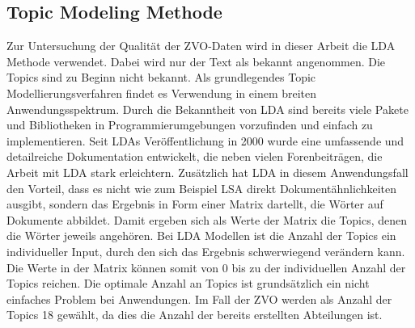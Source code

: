 \documentclass[german,version-2020-11]{uzl-thesis}
\begin{document}
\begin{itemize}
\section{Topic Modeling Methode}
Zur Untersuchung der Qualität der ZVO-Daten wird in dieser Arbeit die LDA Methode verwendet. Dabei wird nur der Text als bekannt angenommen. Die Topics sind zu Beginn nicht bekannt. Als grundlegendes Topic Modellierungsverfahren findet es Verwendung in einem breiten Anwendungsspektrum. Durch die Bekanntheit von LDA sind bereits viele Pakete und Bibliotheken in Programmierumgebungen vorzufinden und einfach zu implementieren. Seit LDAs Veröffentlichung in 2000 wurde eine umfassende und detailreiche Dokumentation entwickelt, die neben vielen Forenbeiträgen, die Arbeit mit LDA stark erleichtern. Zusätzlich hat LDA in diesem Anwendungsfall den Vorteil, dass es nicht wie zum Beispiel LSA direkt Dokumentähnlichkeiten ausgibt, sondern das Ergebnis in Form einer Matrix dartellt, die Wörter auf Dokumente abbildet. Damit ergeben sich als Werte der Matrix die Topics, denen die Wörter jeweils angehören. Bei LDA Modellen ist die Anzahl der Topics ein individueller Input, durch den sich das Ergebnis schwerwiegend verändern kann. Die Werte in der Matrix können somit von $0$ bis zu der individuellen Anzahl der Topics reichen. Die optimale Anzahl an Topics ist grundsätzlich ein nicht einfaches Problem bei Anwendungen. Im Fall der ZVO werden als Anzahl der Topics 18  gewählt, da dies die Anzahl der bereits erstellten Abteilungen ist. 


\end{itemize}
\end{document}
